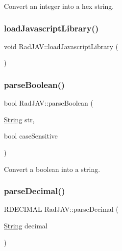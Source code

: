 Convert an integer into a hex string. 

\mbox{\label{namespace_rad_j_a_v_abdc80a52e8c285baa202205c347233ca}} 
\subsubsection{\texorpdfstring{load\+Javascript\+Library()}{loadJavascriptLibrary()}}
{\footnotesize\ttfamily void Rad\+J\+A\+V\+::load\+Javascript\+Library (\begin{DoxyParamCaption}{ }\end{DoxyParamCaption})\hspace{0.3cm}{\ttfamily [inline]}}

\mbox{\label{namespace_rad_j_a_v_aeadea788704996c8d0d8352c434ba1c6}} 
\subsubsection{\texorpdfstring{parse\+Boolean()}{parseBoolean()}}
{\footnotesize\ttfamily bool Rad\+J\+A\+V\+::parse\+Boolean (\begin{DoxyParamCaption}\item[{\mbox{\hyperlink{class_rad_j_a_v_1_1_string}{String}}}]{str,  }\item[{bool}]{case\+Sensitive }\end{DoxyParamCaption})}



Convert a boolean into a string. 

\mbox{\label{namespace_rad_j_a_v_afb127eaa0609cdc7d800f9239bd59e98}} 
\subsubsection{\texorpdfstring{parse\+Decimal()}{parseDecimal()}}
{\footnotesize\ttfamily R\+D\+E\+C\+I\+M\+AL Rad\+J\+A\+V\+::parse\+Decimal (\begin{DoxyParamCaption}\item[{\mbox{\hyperlink{class_rad_j_a_v_1_1_string}{String}}}]{decimal }\end{DoxyParamCaption})}



